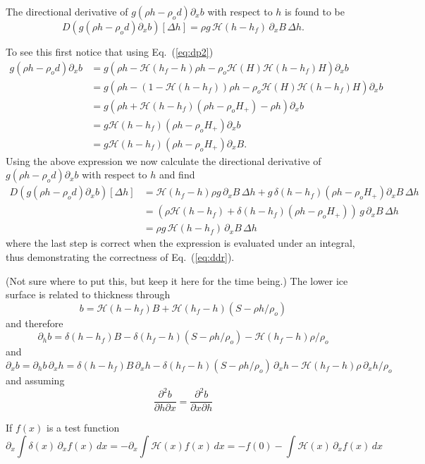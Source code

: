 \documentclass[10pt,a4paper]{book}
\newcommand{\He}{\mathcal{H}}
\newcommand{\p}{\partial}
\begin{document}
The directional derivative of $g(\rho h -\rho_o d) \p_x b$ with respect to $h$ is found to be
\begin{equation}
D\left (g(\rho h -\rho_o d) \p_x b\right )[\Delta h]= \rho g \, \He(h-h_f)   \, \p_x B \, \Delta h .
\label{eq:ddr}
\end{equation}

To see this first notice that using Eq.~(\ref{eq:dp2})
\begin{align*}
g (\rho h - \rho_o d) \p_x b &= g(\rho h - \He(h_f-h) \rho h - \rho_o \He(H) \He(h-h_f) H) \p_x b \\
                            &= g(\rho h -(1-\He(h-h_f)) \rho h - \rho_o \He(H) \He(h-h_f) H) \p_x b \\
                            &=g(\rho h +\He(h-h_f) ( \rho h-\rho_o H_{+})-\rho h) \p_x b \\
                            &=g \He(h-h_f) (\rho h- \rho_o H_{+}) \p_x b \\
                            &=g \He(h-h_f) (\rho h - \rho_o H_{+} ) \p_x B.
\end{align*}
Using the above expression we now calculate the directional derivative of $g(\rho h -\rho_o d) \p_x b$ with respect to
$h$ and find
\begin{align*}
D\left (g(\rho h -\rho_o d) \p_x b\right )[\Delta h]
&=\He(h_f-h) \rho g \, \p_x B \, \Delta h + g\, \delta(h-h_f) (\rho h - \rho_o H_{+} )\p_x B \, \Delta h\\
&= \left ( \rho \He(h-h_f)   + \delta(h-h_f) (\rho h - \rho_o H_{+} ) \right ) \, g \, \p_x B \, \Delta h\\
&=  \rho g \, \He(h-h_f)   \, \p_x B \, \Delta h
\end{align*}
where the last step is correct when the expression is evaluated under an integral, thus demonstrating the correctness of Eq.~(\ref{eq:ddr}).


(Not sure where to put this, but keep it here for the time being.)
The lower ice surface is related to thickness through
\[
b=\He(h-h_f) B + \He(h_f-h) (S-\rho h /\rho_o)
\]
and therefore
\[
\p_h b= \delta(h-h_f) B - \delta(h_f-h) (S-\rho h /\rho_o) - \He(h_f-h) \rho /\rho_o
\]
and
\[
\p_x b= \p_h b \, \p_x h  = \delta(h-h_f) B \, \p_x h - \delta(h_f-h) (S-\rho h /\rho_o) \, \p_x h - \He(h_f-h) \rho \, \p_x h /\rho_o
\]
and assuming
\[
\frac{\p^2 b}{\p h \p x} = \frac{\p^2 b}{\p x \p h}
\]

If $f(x)$ is a test function
\[
\p_x \int \delta(x) \, \p_x f(x) \, dx= - \p_x \int \He(x) f(x) \, dx = - f(0) - \int \He(x) \, \p_x f(x) \, dx
\]
\end{document}
